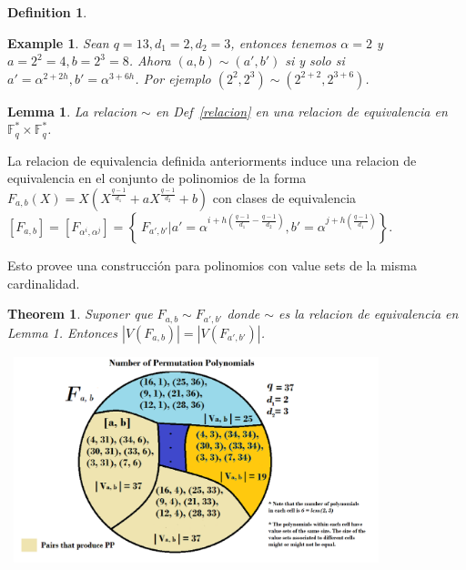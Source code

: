 \documentclass[landscape,final,paperwidth=48in,paperheight=36in]{baposter}
\newtheorem*{example*}{Example}
\newtheorem{definition}{Definition}
\newtheorem{lemma}{Lemma}
\newtheorem{theorem}{Theorem}
\begin{document}
\begin{poster}
{\begin{definition}
\end{definition}

  \begin{example*}
    Sean $q = 13, d_1 = 2, d_2 = 3$, entonces tenemos $\alpha = 2$ y $a = 2^2 = 4, b = 2^3 = 8$. Ahora $(a,b) \sim (a',b')$ si y solo si
    $a' = \alpha^{2+2h}, b' = \alpha^{3+6h}$. Por ejemplo $(2^2,2^3) \sim (2^{2+2},2^{3+6})$.
  \end{example*}

\begin{lemma}
  
  La relacion $\sim$ en Def~\ref{relacion} en una relacion de equivalencia en $\mathbb{F}_q^* \times \mathbb{F}_q^*$.

\end{lemma}

  La relacion de equivalencia definida anteriorments induce una relacion de equivalencia en el conjunto de polinomios de la forma $F_{a,b}(X) = X(X^{\frac{q-1}{d_1}} + aX^{\frac{q-1}{d_2}} +b)$ con clases de equivalencia $[F_{a,b}] = [F_{\alpha^i, \alpha^j}] = \left\{\ F_{a',b'} | a' = \alpha^{i+h(\frac{q-1}{d_1} - \frac{q-1}{d_2})}, b' = \alpha^{j+h(\frac{q-1}{d_1})} \right\}$.

  Esto provee una construcci\'{o}n para polinomios con value sets de la misma cardinalidad.
\begin{theorem}
  
  Suponer que $F_{a,b} \sim F_{a',b'}$ donde $\sim$ es la relacion de equivalencia en Lemma 1. Entonces $|V(F_{a,b})| = |V(F_{a',b'})|$.

\end{theorem}

\includegraphics[width=11cm, height=6cm]{clases}

}\label{Results}


\end{poster}
\end{document}
